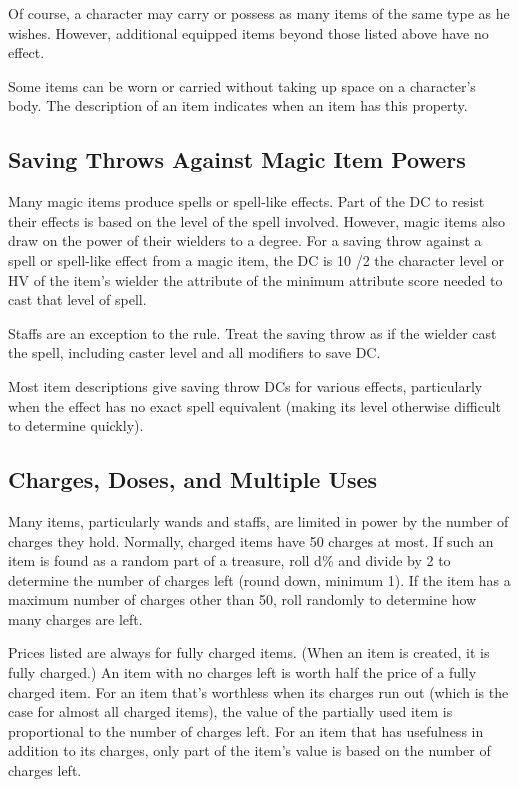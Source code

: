 Of course, a character may carry or possess as many items of the same type as he wishes. However, additional equipped items beyond those listed above have no effect.

Some items can be worn or carried without taking up space on a character's body. The description of an item indicates when an item has this property.

\subsection{Saving Throws Against Magic Item Powers}

Many magic items produce spells or spell-like effects. Part of the DC to resist their effects is based on the level of the spell involved. However, magic items also draw on the power of their wielders to a degree. For a saving throw against a spell or spell-like effect from a magic item, the DC is 10 /2 the character level or HV of the item's wielder \add the attribute of the minimum attribute score needed to cast that level of spell.

Staffs are an exception to the rule. Treat the saving throw as if the wielder cast the spell, including caster level and all modifiers to save DC.

Most item descriptions give saving throw DCs for various effects, particularly when the effect has no exact spell equivalent (making its level otherwise difficult to determine quickly).

\subsection{Charges, Doses, and Multiple Uses}

Many items, particularly wands and staffs, are limited in power by the number of charges they hold. Normally, charged items have 50 charges at most. If such an item is found as a random part of a treasure, roll d\% and divide by 2 to determine the number of charges left (round down, minimum 1). If the item has a maximum number of charges other than 50, roll randomly to determine how many charges are left.

Prices listed are always for fully charged items. (When an item is created, it is fully charged.) An item with no charges left is worth half the price of a fully charged item. For an item that's worthless when its charges run out (which is the case for almost all charged items), the value of the partially used item is proportional to the number of charges left. For an item that has usefulness in addition to its charges, only part of the item's value is based on the number of charges left.

